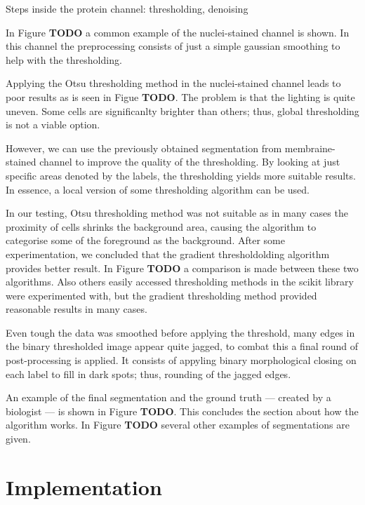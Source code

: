 \documentclass[
  digital,     %
  oneside,     %
  nosansbold,  %
  nocolorbold, %
  lof,         %
  lot,         %
]{fithesis4}
\begin{document}
Steps inside the protein channel: thresholding, denoising

In Figure \textbf{TODO} a common example of the nuclei-stained channel is shown.
In this channel the preprocessing consists of just a simple gaussian smoothing
to help with the thresholding.

Applying the Otsu thresholding method in the nuclei-stained channel leads to
poor results as is seen in Figue \textbf{TODO}. The problem is that the lighting
is quite uneven. Some cells are significanlty brighter than others; thus, global
thresholding is not a viable option.

However, we can use the previously obtained segmentation from membraine-stained
channel to improve the quality of the thresholding. By looking at just specific
areas denoted by the labels, the thresholding yields more suitable results. In
essence, a local version of some thresholding algorithm can be used.

In our testing, Otsu thresholding method was not suitable as in many cases the
proximity of cells shrinks the background area, causing the algorithm to
categorise some of the foreground as the background. After some experimentation,
we concluded that the gradient thresholdolding algorithm provides better result.
In Figure \textbf{TODO} a comparison is made between these two algorithms. Also
others easily accessed thresholding methods in the scikit library were
experimented with, but the gradient thresholding method provided reasonable
results in many cases.

Even tough the data was smoothed before applying the threshold, many edges in
the binary thresholded image appear quite jagged, to combat this a final round
of post-processing is applied. It consists of appyling binary morphological
closing on each label to fill in dark spots; thus, rounding of the jagged edges.

An example of the final segmentation and the ground truth --- created by a
biologist --- is shown in Figure \textbf{TODO}. This concludes the section about
how the algorithm works. In Figure \textbf{TODO} several other examples of
segmentations are given.


\chapter{Implementation}
\end{document}

